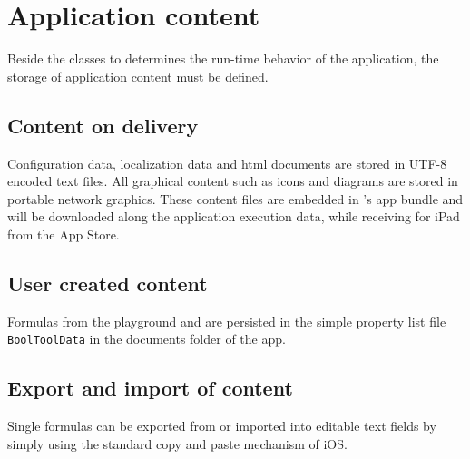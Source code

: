 \section{Application content}

Beside the classes to determines the run-time behavior of the application,
the storage of application content must be defined.

\subsection{Content on delivery}

Configuration data, localization data and html documents
are stored in UTF-8 encoded text files.
All graphical content such as icons and diagrams are stored in portable network graphics.
These content files are embedded in \Nyaya's app bundle
and will be downloaded along the application execution data,
while receiving \Nyaya for iPad from the App Store.

\subsection{User created content}

Formulas from the playground and \BoolTool are persisted 
in the simple property list file \verb+BoolToolData+ 
in the documents folder of the app.

\subsection{Export and import of content}

Single formulas can be exported from or imported into editable text fields 
by simply using the standard copy and paste mechanism of iOS.




